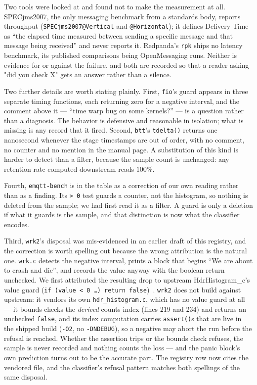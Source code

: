 \documentclass[10pt,journal,onecolumn]{IEEEtran}
\begin{document}
Two tools were looked at and found not to make the measurement at all. SPECjms2007, the only
messaging benchmark from a standards body, reports throughput
(\texttt{SPECjms2007@Vertical} and \texttt{@Horizontal}); it defines Delivery Time as ``the
elapsed time measured between sending a specific message and that message being received''
and never reports it. Redpanda's \texttt{rpk} ships no latency benchmark, its published
comparisons being OpenMessaging runs. Neither is evidence for or against the failure, and
both are recorded so that a reader asking "did you check X" gets an answer rather than a
silence.

Two further details are worth stating plainly. First, \texttt{fio}'s guard appears in three separate
timing functions, each returning zero for a negative interval, and the comment above it ---
``time warp bug on some kernels?'' --- is a question rather than a diagnosis. The behavior
is defensive and reasonable in isolation; what is missing is any record that it fired.
Second, \texttt{btt}'s \texttt{tdelta()} returns one nanosecond whenever the stage
timestamps are out of order, with no comment, no counter and no mention in the manual page.
A substitution of this kind is harder to detect than a filter, because the sample count is
unchanged: any retention rate computed downstream reads $100\%$.

Fourth, \texttt{emqtt-bench} is in the table as a correction of our own reading rather than
as a finding. Its \texttt{>~0} test guards a counter, not the histogram, so nothing is
deleted from the sample; we had first read it as a filter. A guard is only a deletion if what
it guards is the sample, and that distinction is now what the classifier encodes.

Third, \texttt{wrk2}'s disposal was mis-evidenced in an earlier draft of this registry, and
the correction is worth spelling out because the wrong attribution is the natural one.
\texttt{wrk.c} detects the negative interval, prints a block that begins ``We are about to
crash and die'', and records the value anyway with the boolean return unchecked. We first
attributed the resulting drop to upstream HdrHistogram\_c's value guard
(\texttt{if (value < 0 \ldots) return false})~\cite{hdrhistogram_c}. \texttt{wrk2} does not
build against upstream: it vendors its own \texttt{hdr\_histogram.c}, which has no value
guard at all --- it bounds-checks the \emph{derived} counts index (lines 219 and 234) and
returns an unchecked \texttt{false}, and its index computation carries \texttt{assert()}s
that are live in the shipped build (\texttt{-O2}, no \texttt{-DNDEBUG}), so a negative may
abort the run before the refusal is reached. Whether the assertion trips or the bounds check
refuses, the sample is never recorded and nothing counts the loss --- and the panic block's
own prediction turns out to be the accurate part. The registry row now cites the vendored
file, and the classifier's refusal pattern matches both spellings of the same disposal.
\end{document}
